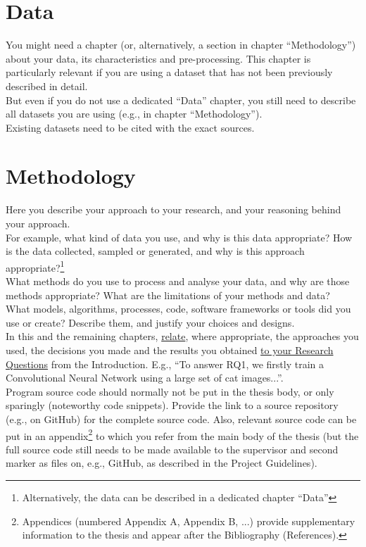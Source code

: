 \documentclass[a4paper,12pt]{Classes/RoboticsLaTeX}
\begin{document}
	\chapter{Data}
	\label{chap:data}
	
	You might need a chapter (or, alternatively, a section in chapter ``Methodology'') about your data, its characteristics and pre-processing. This chapter is particularly relevant if you are using a dataset that has not been previously described in detail.\\
	
	But even if you do not use a dedicated ``Data'' chapter, you still need to describe all datasets you are using (e.g., in chapter ``Methodology'').\\
	
	\noindent Existing datasets need to be cited with the exact sources.
	
	\chapter{Methodology}
	\label{chap:methodology} 
	
	Here you describe your approach to your research, and your reasoning behind your approach.\\
	
	For example, what kind of data you use, and why is this data appropriate? How is the data collected, sampled or generated, and why is this approach appropriate?\footnote{Alternatively, the data can be described in a dedicated chapter ``Data''} \\
	
	What methods do you use to process and analyse your data, and why are those methods appropriate? What are the limitations of your methods and data? \\
	
	What models, algorithms, processes, code, software frameworks or tools did you use or create? Describe them, and justify your choices and designs. \\
	
	In this and the remaining chapters, \underline{relate}, where appropriate, the approaches you used, the decisions you made and the results you obtained \underline{to your Research Questions} from the Introduction. E.g., ``To answer RQ1, we firstly train a Convolutional Neural Network using a large set of cat images...''.\\
	
		Program source code should normally not be put in the thesis body, or only sparingly (noteworthy code snippets). Provide the link to a source repository (e.g., on GitHub) for the complete source code. Also, relevant source code can be put in an appendix\footnote{Appendices (numbered Appendix A, Appendix B, ...) provide supplementary information to the thesis and appear after the Bibliography (References).} to which you refer from the main body of the thesis (but the full source code still needs to be made available to the supervisor and second marker as files on, e.g., GitHub, as described in the Project Guidelines).
	
\end{document}

